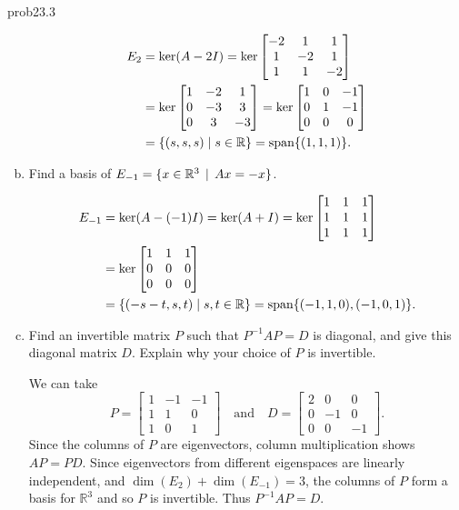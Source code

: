 \begin{sol}{prob23.3}
\begin{enumerate}[a)]
\soln \begin{align*}
E_2 &= \ker(A-2I) = \ker\begin{bmatrix} -2 & 1 & 1\\ 1 & -2 & 1\\ 1 & 1 & -2 \end{bmatrix}\\ 
&= \ker \begin{bmatrix} 1&-2&1\\0&-3&3\\0&3&-3\end{bmatrix} =
\ker \begin{bmatrix} 1&0&-1\\0&1&-1\\0&0&0\end{bmatrix}\\
&= \{ (s,s,s) \mid s\in \mathbb{R}\} = \textrm{span}\{ (1,1,1) \}.
\end{align*}
\item Find a basis of $E_{-1} =\{x\in \mathbb{R}^3 \,\mid \, Ax=-x \}$. 

 \soln
 \begin{align*}
E_{-1} &= \ker(A-(-1)I) = \ker(A+I) = \ker\begin{bmatrix} 1 & 1 & 1\\ 1 & 1 & 1\\ 1 & 1 & 1 \end{bmatrix}\\ 
&= \ker \begin{bmatrix} 1&1&1\\0&0&0\\0&0&0\end{bmatrix} \\
&= \{ (-s-t,s,t) \mid s,t\in \mathbb{R}\} = \textrm{span}\{ (-1,1,0),(-1,0,1) \}.
\end{align*}

\item Find an invertible  matrix 
$P$ such that $P^{-1}AP=D$ is diagonal,  and give this diagonal matrix $D$. Explain why
your choice of $P$ is invertible.

\soln We can take
$$ 
P=\begin{bmatrix} 1 &-1 & -1 \\ 1 & 1 & 0\\ 1 & 0 & 1\end{bmatrix}
\quad \text{and} \quad 
D = \begin{bmatrix} 2 & 0 & 0 \\ 0 & -1 & 0 \\ 0 & 0 & -1 \end{bmatrix}.
$$
Since the columns of $P$ are eigenvectors, column multiplication shows $AP=PD$.  Since eigenvectors from different eigenspaces are linearly independent, and $\dim(E_2)+\dim(E_{-1})=3$, the columns of $P$ form a basis for $\mathbb{R}^3$ and so $P$ is invertible.  Thus $P^{-1}AP=D$.


\end{enumerate}
\end{sol}
